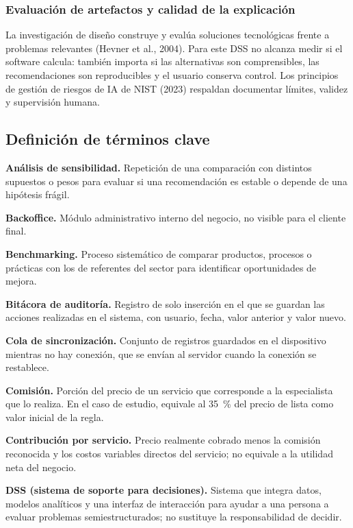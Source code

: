 \subsubsection{Evaluación de artefactos y calidad de la explicación}

La investigación de diseño construye y evalúa soluciones tecnológicas frente a problemas relevantes (Hevner et al., 2004). Para este DSS no alcanza medir si el software calcula: también importa si las alternativas son comprensibles, las recomendaciones son reproducibles y el usuario conserva control. Los principios de gestión de riesgos de IA de NIST (2023) respaldan documentar límites, validez y supervisión humana.

\subsection{Definición de términos clave}

\noindent \textbf{Análisis de sensibilidad.} Repetición de una comparación con distintos supuestos o pesos para evaluar si una recomendación es estable o depende de una hipótesis frágil.

\noindent \textbf{Backoffice.} Módulo administrativo interno del negocio, no visible para el cliente final.

\noindent \textbf{Benchmarking.} Proceso sistemático de comparar productos, procesos o prácticas con los de referentes del sector para identificar oportunidades de mejora.

\noindent \textbf{Bitácora de auditoría.} Registro de solo inserción en el que se guardan las acciones realizadas en el sistema, con usuario, fecha, valor anterior y valor nuevo.

\noindent \textbf{Cola de sincronización.} Conjunto de registros guardados en el dispositivo mientras no hay conexión, que se envían al servidor cuando la conexión se restablece.

\noindent \textbf{Comisión.} Porción del precio de un servicio que corresponde a la especialista que lo realiza. En el caso de estudio, equivale al 35~\% del precio de lista como valor inicial de la regla.

\noindent \textbf{Contribución por servicio.} Precio realmente cobrado menos la comisión reconocida y los costos variables directos del servicio; no equivale a la utilidad neta del negocio.

\noindent \textbf{DSS (sistema de soporte para decisiones).} Sistema que integra datos, modelos analíticos y una interfaz de interacción para ayudar a una persona a evaluar problemas semiestructurados; no sustituye la responsabilidad de decidir.

